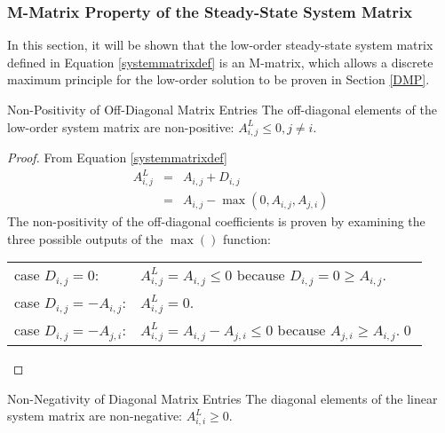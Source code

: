 \subsubsection{M-Matrix Property of the Steady-State System Matrix}
In this section, it will be shown that the low-order steady-state
system matrix defined in Equation \eqref{systemmatrixdef} is an M-matrix, which
allows a discrete maximum principle for the low-order solution to be proven in
Section \ref{DMP}.
\begin{lemma}[label={offdiagonalnegative}]{Non-Positivity of Off-Diagonal Matrix Entries}
   The off-diagonal elements of the low-order system matrix are non-positive:
   $A^L_{i,j}\le 0, j\ne i$.
\end{lemma}
\begin{proof}
From Equation \eqref{systemmatrixdef}
\begin{eqnarray*}
	A^L_{i,j} & = & A_{i,j} + D_{i,j}\\
             & = & A_{i,j} - \max(0,A_{i,j},A_{j,i})
\end{eqnarray*}
The non-positivity of the off-diagonal coefficients is proven by examining the three possible
outputs of the $\max()$ function:

\begin{tabular}{l l}
   case $D_{i,j}=0$:        & $A^L_{i,j} = A_{i,j} \leq 0$ because
      $D_{i,j}=0\geq A_{i,j}$.\\
   case $D_{i,j}=-A_{i,j}$: & $A^L_{i,j} = 0$.\\
   case $D_{i,j}=-A_{j,i}$: & $A^L_{i,j} = A_{i,j} - A_{j,i} \leq 0$ because
      $A_{j,i} \geq A_{i,j}$.\qed
\end{tabular}
\end{proof}
\begin{lemma}[label={diagonalpositive}]{Non-Negativity of Diagonal Matrix Entries}
   The diagonal elements of the linear system matrix are non-negative: $A^L_{i,i}\ge 0$.
\end{lemma}
